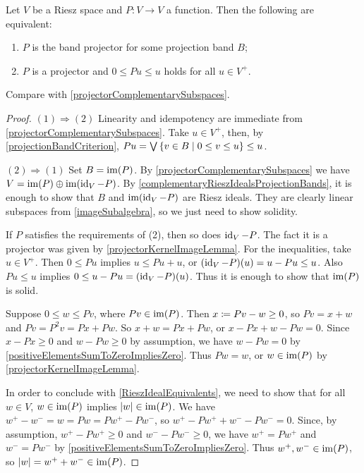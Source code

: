 \begin{proposition} \label{projectorOnProjectionBand}
Let $V$ be a Riesz space and $P: V\to V$ a function. Then the following are equivalent:
\begin{enumerate}
\item $P$ is the band projector for some projection band $B$;
\item $P$ is a projector and $0\leq Pu \leq u$ holds for all $u\in V^+$.
\end{enumerate}
\end{proposition}
Compare with \ref{projectorComplementarySubspaces}.
\begin{proof}
$(1) \Rightarrow (2)$ Linearity and idempotency are immediate from \ref{projectorComplementarySubspaces}. Take $u\in V^+$, then, by \ref{projectionBandCriterion}, $Pu = \bigvee \setbuilder{v\in B}{0\leq v\leq u} \leq u$.

$(2) \Rightarrow (1)$ Set $B = \operatorname{im}(P)$. By \ref{projectorComplementarySubspaces} we have $V = \operatorname{im}(P)\oplus \operatorname{im}(\operatorname{id}_V-P)$. By \ref{complementaryRieszIdealsProjectionBands}, it is enough to show that $B$ and $\operatorname{im}(\operatorname{id}_V-P)$ are Riesz ideals. They are clearly linear subspaces from \ref{imageSubalgebra}, so we just need to show solidity.

If $P$ satisfies the requirements of (2), then so does $\operatorname{id}_V-P$. The fact it is a projector was given by \ref{projectorKernelImageLemma}. For the inequalities, take $u\in V^+$. Then $0\leq Pu$ implies $u\leq Pu + u$, or $(\operatorname{id}_V-P)(u) = u-Pu \leq u$. Also $Pu \leq u$ implies $0\leq u - Pu = (\operatorname{id}_V - P)(u)$. Thus it is enough to show that $\operatorname{im}(P)$ is solid.

Suppose $0\leq w \leq Pv$, where $Pv\in \operatorname{im}(P)$. Then $x\coloneqq Pv - w \geq 0$, so $Pv = x+w$ and $Pv = P^2v = Px + Pw$. So $x+w = Px+Pw$, or $x-Px + w-Pw = 0$. Since $x-Px\geq 0$ and $w-Pw \geq 0$ by assumption, we have $w-Pw = 0$ by \ref{positiveElementsSumToZeroImpliesZero}. Thus $Pw = w$, or $w\in \operatorname{im}(P)$ by \ref{projectorKernelImageLemma}.

In order to conclude with \ref{RieszIdealEquivalents}, we need to show that for all $w\in V$, $w\in \operatorname{im}(P)$ implies $|w|\in \operatorname{im}(P)$. We have $w^+ - w^- = w =Pw = Pw^+ - Pw^-$, so $w^+ - Pw^+ + w^- - Pw^- = 0$. Since, by assumption, $w^+ - Pw^+ \geq 0$ and $w^- - Pw^- \geq 0$, we have $w^+  = Pw^+$ and $w^- = Pw^-$ by \ref{positiveElementsSumToZeroImpliesZero}. Thus $w^+, w^-\in\operatorname{im}(P)$, so $|w| = w^++w^- \in \operatorname{im}(P)$.
\end{proof}

